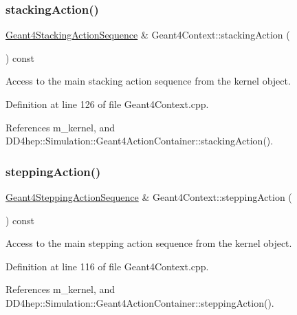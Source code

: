 \subsubsection{\texorpdfstring{stacking\+Action()}{stackingAction()}}
{\footnotesize\ttfamily \hyperlink{class_d_d4hep_1_1_simulation_1_1_geant4_stacking_action_sequence}{Geant4\+Stacking\+Action\+Sequence} \& Geant4\+Context\+::stacking\+Action (\begin{DoxyParamCaption}{ }\end{DoxyParamCaption}) const}



Access to the main stacking action sequence from the kernel object. 



Definition at line 126 of file Geant4\+Context.\+cpp.



References m\+\_\+kernel, and D\+D4hep\+::\+Simulation\+::\+Geant4\+Action\+Container\+::stacking\+Action().

\hypertarget{class_d_d4hep_1_1_simulation_1_1_geant4_context_ad33f2c819cb0b1fee1fd30c1e784b42c}{}\label{class_d_d4hep_1_1_simulation_1_1_geant4_context_ad33f2c819cb0b1fee1fd30c1e784b42c} 
\subsubsection{\texorpdfstring{stepping\+Action()}{steppingAction()}}
{\footnotesize\ttfamily \hyperlink{class_d_d4hep_1_1_simulation_1_1_geant4_stepping_action_sequence}{Geant4\+Stepping\+Action\+Sequence} \& Geant4\+Context\+::stepping\+Action (\begin{DoxyParamCaption}{ }\end{DoxyParamCaption}) const}



Access to the main stepping action sequence from the kernel object. 



Definition at line 116 of file Geant4\+Context.\+cpp.



References m\+\_\+kernel, and D\+D4hep\+::\+Simulation\+::\+Geant4\+Action\+Container\+::stepping\+Action().

\hypertarget{class_d_d4hep_1_1_simulation_1_1_geant4_context_a86eb704863a06c584df3d6d4770b7212}{}\label{class_d_d4hep_1_1_simulation_1_1_geant4_context_a86eb704863a06c584df3d6d4770b7212} 
